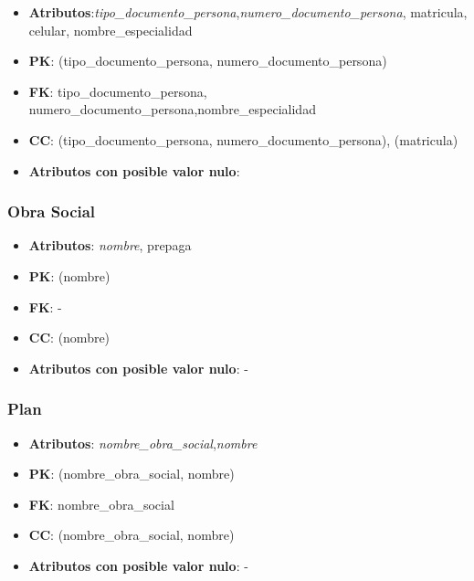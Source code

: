 \documentclass[a4paper,11pt]{article}
\begin{document}
\begin{itemize}

\item 
\textbf{Atributos}:\emph{tipo\_documento\_persona},\emph{numero\_documento\_persona}, matricula, celular,  nombre\_especialidad

\item 
\textbf{PK}: (tipo\_documento\_persona, numero\_documento\_persona)

\item
\textbf{FK}: tipo\_documento\_persona, numero\_documento\_persona,nombre\_especialidad

\item 
\textbf{CC}: (tipo\_documento\_persona, numero\_documento\_persona), (matricula)

\item 
\textbf{Atributos con posible valor nulo}:

\end{itemize}

\subsubsection{\textbf{Obra Social}}

\begin{itemize}

\item 
\textbf{Atributos}: \emph{nombre}, prepaga

\item 
\textbf{PK}: (nombre)

\item
\textbf{FK}: -

\item 
\textbf{CC}: (nombre)

\item 
\textbf{Atributos con posible valor nulo}: -

\end{itemize}

\subsubsection{\textbf{Plan}}

\begin{itemize}

\item 
\textbf{Atributos}: \emph{nombre\_obra\_social},\emph{nombre}

\item 
\textbf{PK}: (nombre\_obra\_social, nombre)

\item
\textbf{FK}: nombre\_obra\_social

\item 
\textbf{CC}: (nombre\_obra\_social, nombre)

\item 
\textbf{Atributos con posible valor nulo}: -

\end{itemize}
\end{document}
